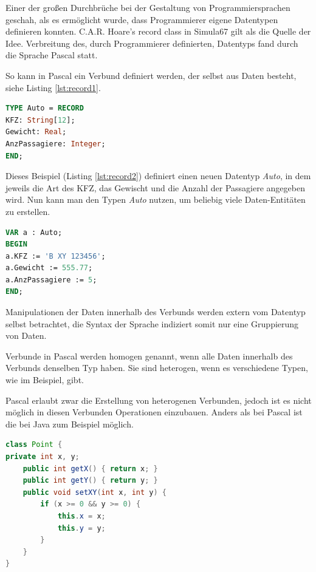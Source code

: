 \documentclass[
	12pt, %
	a4paper,
	listof=totoc, %
	bibliography=totoc, %
	numbers=noenddot, %
	ngerman, %
	headsepline, %
	oneside %
	]{scrbook} %
\begin{document}
Einer der großen Durchbrüche bei der Gestaltung von Programmiersprachen geschah, als es ermöglicht wurde, dass Programmierer eigene Datentypen definieren konnten. C.A.R. Hoare's record class in Simula67 gilt als die Quelle der Idee.\cite{OOPL}
Verbreitung des, durch Programmierer definierten, Datentyps fand durch die Sprache Pascal statt. \cite{Pascal}

So kann in Pascal ein Verbund definiert werden, der selbst aus Daten besteht, siehe Listing \ref{lst:record1}. 

\begin{lstlisting}[language=Pascal, caption=Verbund Beispiel Definition \cite{PascalVerbund}, label={lst:record1}]
TYPE Auto = RECORD
KFZ: String[12];
Gewicht: Real;
AnzPassagiere: Integer;
END;
\end{lstlisting}

Dieses Beispiel (Listing \ref{lst:record2}) definiert einen neuen Datentyp \textit{Auto}, in dem jeweils die Art des KFZ, das Gewischt und die Anzahl der Passagiere angegeben wird. Nun kann man den Typen \textit{Auto} nutzen, um beliebig viele Daten-Entitäten zu erstellen.

\begin{lstlisting}[language=Pascal, caption=Verbund Beispiel Instantiierung \cite{PascalVerbund}, label={lst:record2}]
VAR a : Auto;
BEGIN
a.KFZ := 'B XY 123456';
a.Gewicht := 555.77;
a.AnzPassagiere := 5;
END;
\end{lstlisting}

Manipulationen der Daten innerhalb des Verbunds werden extern vom Datentyp selbst betrachtet, die Syntax der Sprache indiziert somit nur eine Gruppierung von Daten.

Verbunde in Pascal werden homogen genannt, wenn alle Daten innerhalb des Verbunds denselben Typ haben. Sie sind heterogen, wenn es verschiedene Typen, wie im Beispiel, gibt.

Pascal erlaubt zwar die Erstellung von heterogenen Verbunden, jedoch ist es nicht möglich in diesen Verbunden Operationen einzubauen. Anders als bei Pascal ist die bei Java zum Beispiel möglich.  

\begin{lstlisting}[language=Java, caption=Operation innerhalb einer Klasse \cite{OOPL}, label={lst:Java-Operation}]
class Point {
private int x, y;
	public int getX() { return x; }
	public int getY() { return y; }
	public void setXY(int x, int y) {
		if (x >= 0 && y >= 0) {
			this.x = x;
			this.y = y;
		}
	}
}
\end{lstlisting}
\end{document}
